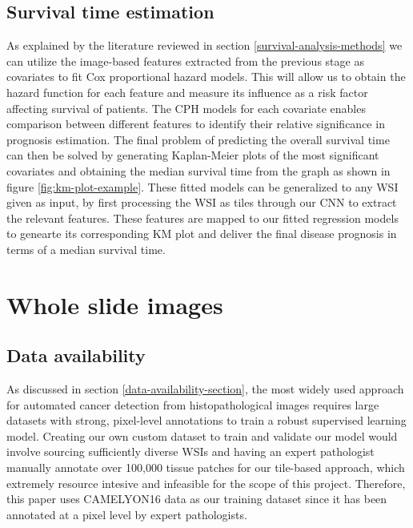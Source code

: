 \documentclass{l4proj}
\begin{document}
\subsection{Survival time estimation}
As explained by the literature reviewed in section \ref{survival-analysis-methods} we can utilize the image-based features extracted from the previous stage as covariates to fit Cox proportional hazard models. This will allow us to obtain the hazard function for each feature and measure its influence as a risk factor affecting survival of patients. The CPH models for each covariate enables comparison between different features to identify their relative significance in prognosis estimation. The final problem of predicting the overall survival time can then be solved by generating Kaplan-Meier plots of the most significant covariates and obtaining the median survival time from the graph as shown in figure \ref{fig:km-plot-example}. These fitted models can be generalized to any WSI given as input, by first processing the WSI as tiles through our CNN to extract the relevant features. These features are mapped to our fitted regression models to genearte its corresponding KM plot and deliver the final disease prognosis in terms of a median survival time. 

\section{Whole slide images}
\subsection{Data availability}
As discussed in section \ref{data-availability-section}, the most widely used approach for automated cancer detection from histopathological images requires large datasets with strong, pixel-level annotations to train a robust supervised learning model. Creating our own custom dataset to train and validate our model would involve sourcing sufficiently diverse WSIs and having an expert pathologist manually annotate over 100,000 tissue patches for our tile-based approach, which extremely resource intesive and infeasible for the scope of this project. Therefore, this paper uses CAMELYON16 data as our training dataset since it has been annotated at a pixel level by expert pathologists.
\end{document}
